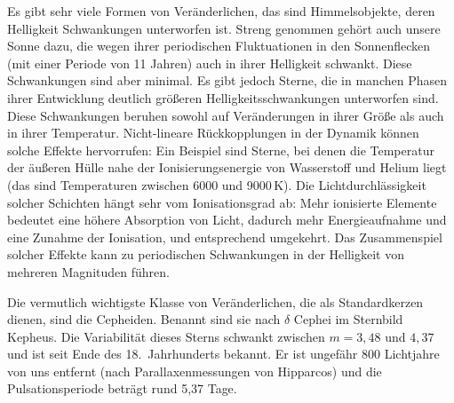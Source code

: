 Es gibt sehr viele Formen von Ver\"anderlichen, 
das sind Himmelsobjekte, deren Helligkeit Schwankungen
unterworfen ist. Streng genommen geh\"ort auch unsere Sonne dazu, die wegen ihrer periodischen
Fluktuationen in den Sonnenflecken (mit einer Periode von 11 Jahren)
auch in ihrer Helligkeit schwankt. Diese Schwankungen sind aber
minimal. Es gibt jedoch Sterne, die in manchen Phasen ihrer Entwicklung deutlich gr\"o\ss eren 
Helligkeitsschwankungen unterworfen sind. Diese Schwankungen beruhen sowohl auf Ver\"anderungen
in ihrer Gr\"o\ss e als auch in ihrer Temperatur. Nicht-lineare R\"uckkopplungen in der Dynamik k\"onnen
solche Effekte hervorrufen: Ein Beispiel sind Sterne, bei denen die Temperatur der \"au\ss eren H\"ulle 
nahe der Ionisierungsenergie von Wasserstoff und Helium liegt (das sind
Temperaturen zwischen 6000 und 9000\,K). Die Lichtdurchl\"assigkeit solcher Schichten h\"angt sehr
vom Ionisationsgrad ab: Mehr ionisierte Elemente bedeutet eine h\"ohere Absorption von Licht, dadurch
mehr Energieaufnahme und eine Zunahme der Ionisation, und entsprechend umgekehrt. Das Zusammenspiel
solcher Effekte kann
zu periodischen Schwankungen in der Helligkeit von mehreren Magnituden f\"uhren. 

Die vermutlich wichtigste Klasse von Ver\"anderlichen, die als Standardkerzen dienen, sind die
Cepheiden. 
Benannt sind sie nach $\delta$ Cephei im Sternbild Kepheus. Die Variabilit\"at dieses Sterns schwankt 
zwischen $m=3,48$ und $4,37$ und ist seit Ende des 18.\ Jahrhunderts bekannt. 
Er ist ungef\"ahr 800 Lichtjahre von uns entfernt (nach Parallaxenmessungen
von Hipparcos) und die Pulsationsperiode betr\"agt rund 5,37 Tage. 

